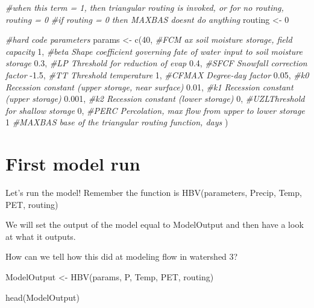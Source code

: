 \documentclass[
]{book}
\newenvironment{Shaded}{\begin{snugshade}}{\end{snugshade}}
\newcommand{\CommentTok}[1]{\textcolor[rgb]{0.56,0.35,0.01}{\textit{#1}}}
\newcommand{\DecValTok}[1]{\textcolor[rgb]{0.00,0.00,0.81}{#1}}
\newcommand{\FloatTok}[1]{\textcolor[rgb]{0.00,0.00,0.81}{#1}}
\newcommand{\FunctionTok}[1]{\textcolor[rgb]{0.00,0.00,0.00}{#1}}
\newcommand{\NormalTok}[1]{#1}
\newcommand{\OtherTok}[1]{\textcolor[rgb]{0.56,0.35,0.01}{#1}}
\newcommand{\SpecialCharTok}[1]{\textcolor[rgb]{0.00,0.00,0.00}{#1}}
\begin{document}
\begin{Shaded}
\begin{Highlighting}[]
\CommentTok{\#when this term = 1, then triangular routing is invoked, or for no routing, routing = 0}
\CommentTok{\#if routing = 0 then MAXBAS doesn\textquotesingle{}t do anything}
\NormalTok{routing }\OtherTok{\textless{}{-}} \DecValTok{0}      

\CommentTok{\#hard code parameters }
\NormalTok{params }\OtherTok{\textless{}{-}} \FunctionTok{c}\NormalTok{(}\DecValTok{40}\NormalTok{,    }\CommentTok{\#FCM ax soil moisture storage, field capacity}
            \DecValTok{1}\NormalTok{,     }\CommentTok{\#beta Shape coefficient governing fate of water input to soil moisture storage}
            \FloatTok{0.3}\NormalTok{,   }\CommentTok{\#LP Threshold for reduction of evap}
            \FloatTok{0.4}\NormalTok{,   }\CommentTok{\#SFCF Snowfall correction factor}
            \SpecialCharTok{{-}}\FloatTok{1.5}\NormalTok{,  }\CommentTok{\#TT Threshold temperature}
            \DecValTok{1}\NormalTok{,     }\CommentTok{\#CFMAX Degree{-}day factor}
            \FloatTok{0.05}\NormalTok{,  }\CommentTok{\#k0 Recession constant (upper storage, near surface)}
            \FloatTok{0.01}\NormalTok{,  }\CommentTok{\#k1 Recession constant (upper storage)}
            \FloatTok{0.001}\NormalTok{, }\CommentTok{\#k2 Recession constant (lower storage)}
            \DecValTok{0}\NormalTok{,     }\CommentTok{\#UZLThreshold for shallow storage}
            \DecValTok{0}\NormalTok{,     }\CommentTok{\#PERC Percolation, max flow from upper to lower storage}
            \DecValTok{1}      \CommentTok{\#MAXBAS base of the triangular routing function, days}
\NormalTok{            )}
\end{Highlighting}
\end{Shaded}

\hypertarget{first-model-run}{%
\section{First model run}\label{first-model-run}}

Let's run the model! Remember the function is HBV(parameters, Precip, Temp, PET, routing)

We will set the output of the model equal to ModelOutput and then have a look at what it outputs.

How can we tell how this did at modeling flow in watershed 3?

\begin{Shaded}
\begin{Highlighting}[]
\NormalTok{ModelOutput }\OtherTok{\textless{}{-}} \FunctionTok{HBV}\NormalTok{(params, P, Temp, PET, routing)}

\FunctionTok{head}\NormalTok{(ModelOutput)}
\end{Highlighting}
\end{Shaded}
\end{document}
